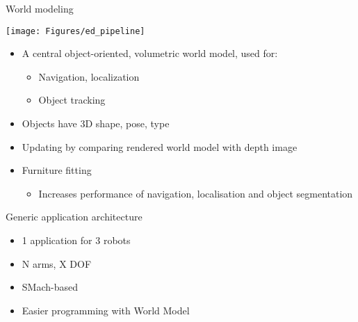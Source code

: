 \documentclass[12pt,a4paper]{article}
\newcommand{\emptylogo}{\texttt{[image: Figures/Empty]}}
\begin{document}
\begin{slidetop}
\begin{multicols}{2}
\vfill
\columnbreak

\begin{bclogo}[couleur = white, arrondi = 0.25, couleurBord = tuedarkblue , barre = none, logo=\emptylogo]{\textcolor{tuedarkblue}{World modeling}}
\medskip %
\begin{minipage}[T]{\textwidth}
    \begin{center}
        \texttt{[image: Figures/ed\_pipeline]}
    \end{center}
\end{minipage}
\begin{itemize}[itemsep = 0pt, parsep = 0pt, leftmargin=15pt]
	\item A central object-oriented, volumetric world model, used for:
	\begin{itemize}[itemsep = 0pt, parsep = 0pt, leftmargin=15pt]
		\item Navigation, localization
		\item Object tracking
	\end{itemize}
	\item Objects have 3D shape, pose, type
	\item Updating by comparing rendered world model with depth image
    \item Furniture fitting
    \begin{itemize}[itemsep = 0pt, parsep = 0pt, leftmargin=15pt]
		\item Increases performance of navigation, localisation and object segmentation
	\end{itemize}


\end{itemize}
\end{bclogo}

\vspace{-0.8cm} %

\begin{bclogo}[couleur = white, arrondi = 0.25, couleurBord = tuedarkblue , barre = none, logo=\emptylogo]{\textcolor{tuedarkblue}{Generic application architecture}}
\begin{itemize}[itemsep = 0pt, parsep = 0pt, leftmargin=15pt]
	\item 1 application for 3 robots
    \item N arms, X DOF
    \item SMach-based
    \item Easier programming with World Model
\end{itemize}
\end{bclogo}


\end{multicols}
\end{slidetop}
\end{document}
